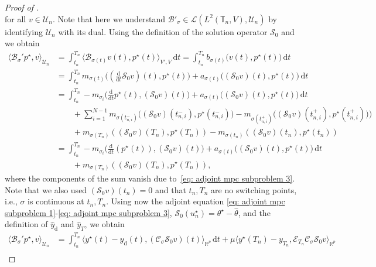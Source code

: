 \documentclass[reqno]{amsart}
\newcommand{\U}{{\mathscr U}}
\newcommand{\R}{\mathbb R}
\newcommand{\timeInt}{\mathbb{T}}
\newcommand{\state}{\theta}
\newcommand{\adState}{p}
\newcommand{\desired}[1]{#1_{\mathrm{d}}}
\newcommand{\inpVar}{u}
\newcommand{\outVar}{y}
\newcommand{\outVarDes}{\desired{y}}
\newcommand{\hatoutVarDes}{\desired{\hat y}}
\newcommand{\outVarDim}{p}
\newcommand{\dt}{\,\mathrm{d}t}
\newcommand{\ddt}{\tfrac{\mathrm{d}}{\mathrm{d}t}}
\newcommand{\bOper}{\calB}
\newcommand{\cOper}{\calC}
\newcommand{\solOper}{\calS_{0}}
\newcommand{\optState}{\state^\star}
\newcommand{\optAdState}{\adState^\star}
\newcommand{\optInpVar}[1]{\inpVar_{#1}^\star}
\newcommand{\optInpVarN}{\optInpVar{n}}
\newcommand{\optOutVar}{\outVar^\star}
\newcommand{\switch}{\sigma}
\newcommand{\nrSwitches}{N}
\newcommand{\calB}{\mathcal{B}}
\newcommand{\calC}{\mathcal{C}}
\newcommand{\calE}{\mathcal{E}}
\newcommand{\calL}{\mathcal{L}}
\newcommand{\calS}{\mathcal{S}}
\begin{document}
\begin{proof}[Proof of ]
\begin{equation*}
    \end{equation*}
    for all $v\in \U_n$. Note that here we understand $\bOper'_\switch \in \calL(L^2(\timeInt_n,V), \U_n)$ by identifying $\U_n$ with its dual. Using the definition of the solution operator $\solOper$ and  we obtain
    \begin{align*}
        \langle \calB_{\switch}'\optAdState , v \rangle_{\U_n} 
        &= \int_{t_n}^{T_n} \langle \calB_{\sigma(t)}v(t),\optAdState(t)\rangle_{V',V} \dt =\int_{t_n}^{T_n} b_{\switch(t)}\big(v(t),\optAdState(t)\big)\dt\\
        &= \int_{t_n}^{T_n} m_{\switch(t)}\big((\ddt\solOper v)(t),\optAdState(t)\big) + a_{\switch(t)}\big((\solOper v)(t),\optAdState(t)\big) \dt\\
        &= \int_{t_n}^{T_n}-m_{\switch_i}\big(\ddt \optAdState(t),(\solOper v)(t)\big) + a_{\switch(t)}\big((\solOper v)(t),\optAdState(t)\big) \dt \\
        &\qquad +   \sum_{i=1}^{\nrSwitches-1} m_{\switch(t^-_{n,i})}\big((\solOper v)(t_{n,i}^{-}),\optAdState(t_{n,i}^-)\big) - m_{\switch(t^{+}_{n,i})}\big((\solOper v)(t_{n,i}^+),\optAdState(t_{n,i}^+))\big) \\ 
        &\qquad +m_{\switch(T_n)}((\solOper v)(T_n),\optAdState(T_n))-m_{\switch(t_n)}((\solOper v)(t_n),\optAdState(t_n))\\
        &= \int_{t_n}^{T_n} -m_{\switch_i}\big(\ddt\left( \optAdState(t)\right),(\solOper v)(t)\big) + a_{\switch(t)}\big((\solOper v)(t),\optAdState(t)\big) \dt \\
        &\qquad +m_{\switch(T_n)}((\solOper v)(T_n),\optAdState(T_n)),
    \end{align*}
    where the components of the sum vanish due to~\eqref{eq: adjoint mpc subproblem 3}. Note that we also used $(\solOper v)(t_n) = 0$ and that $t_n, T_n$ are no switching points, i.e., $\switch$ is continuous at $t_n,T_n$. Using now the adjoint equation \eqref{eq: adjoint mpc subproblem 1}-\eqref{eq: adjoint mpc subproblem 3}, $\solOper(\optInpVarN) = \optState-\hat \state$, and the definition of $\hatoutVarDes$ and $\hat \outVar_T$, we obtain
    \begin{align*}
        \langle \bOper_{\switch}'\optAdState , v \rangle_{\U_n} 
        &= \int_{t_n}^{T_n} \langle \optOutVar(t) - \outVarDes(t), (\cOper_{\switch}\solOper v)(t)\rangle_{\R^{\outVarDim}} \dt  + {\mu}\langle \optOutVar(T_n)- \outVar_{T_n},\calE_{T_n}\cOper_{\switch}\solOper v\rangle_{\R^{\outVarDim}} \\

\end{align*}
\end{proof}
\end{document}
